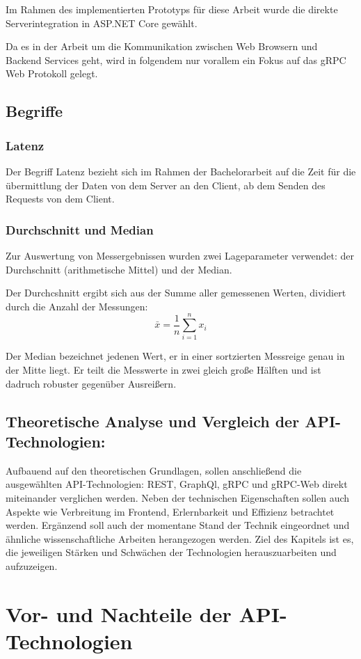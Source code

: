 Im Rahmen des implementierten Prototyps für diese Arbeit wurde die direkte Serverintegration in ASP.NET Core gewählt.

Da es in der Arbeit um die Kommunikation zwischen Web Browsern und Backend Services geht, wird in folgendem nur vorallem ein Fokus auf das gRPC Web Protokoll gelegt.

\clearpage
\subsection{Begriffe}
\subsubsection{Latenz}
Der Begriff Latenz bezieht sich im Rahmen der Bachelorarbeit auf die Zeit für die übermittlung der Daten von dem Server an den Client, ab dem Senden des Requests von dem Client.
\subsubsection{Durchschnitt und Median}
Zur Auswertung von Messergebnissen wurden zwei Lageparameter verwendet: der Durchschnitt (arithmetische Mittel) und der Median. 

Der Durchcshnitt ergibt sich aus der Summe aller gemessenen Werten, dividiert durch die Anzahl der Messungen:
\[
\bar{x} = \frac{1}{n} \sum_{i=1}^n x_i
\]

Der Median bezeichnet jedenen Wert, er in einer sortzierten Messreige genau in der Mitte liegt. Er teilt die Messwerte in zwei gleich große Hälften und ist dadruch robuster gegenüber Ausreißern.

\clearpage
\subsection{Theoretische Analyse und Vergleich der API-Technologien:}

Aufbauend auf den theoretischen Grundlagen, sollen anschließend die ausgewählten API-Technologien: REST, GraphQl, gRPC und gRPC-Web direkt miteinander verglichen werden. Neben der technischen Eigenschaften sollen auch Aspekte wie Verbreitung im Frontend, Erlernbarkeit und Effizienz betrachtet werden. Ergänzend soll auch der momentane Stand der Technik eingeordnet und ähnliche wissenschaftliche Arbeiten herangezogen werden.
Ziel des Kapitels ist es, die jeweiligen Stärken und Schwächen der Technologien herauszuarbeiten und aufzuzeigen.

\section{Vor- und Nachteile der API-Technologien}

